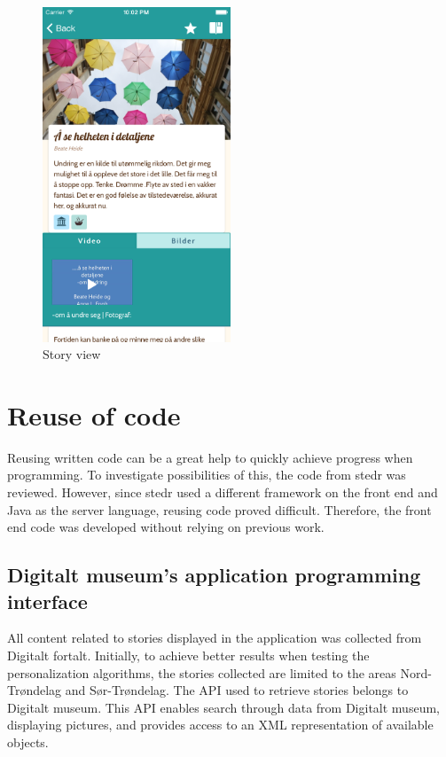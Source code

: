 \begin{figure}[h!]
	\centering
	\includegraphics[width=0.5\textwidth]{fig/story_view}
	\caption{Story view}
	\label{Fig:story_view}
\end{figure}


\section{Reuse of code}

Reusing written code can be a great help to quickly achieve progress when programming.  To investigate possibilities of this, the code from stedr was reviewed. However, since stedr used a different framework on the front end and Java as the server language, reusing code proved difficult. Therefore, the front end code was developed without relying on previous work.

\subsection{Digitalt museum’s application programming interface}
\label{subsec:api}

All content related to stories displayed in the application was collected from Digitalt fortalt. Initially, to achieve better results when testing the personalization algorithms, the stories collected are limited to the areas Nord-Trøndelag and Sør-Trøndelag. The API \cite{digitaltMuseum} used to retrieve stories belongs to Digitalt museum. This API enables search through data from Digitalt museum, displaying pictures, and provides access to an XML representation of available objects.\newline

